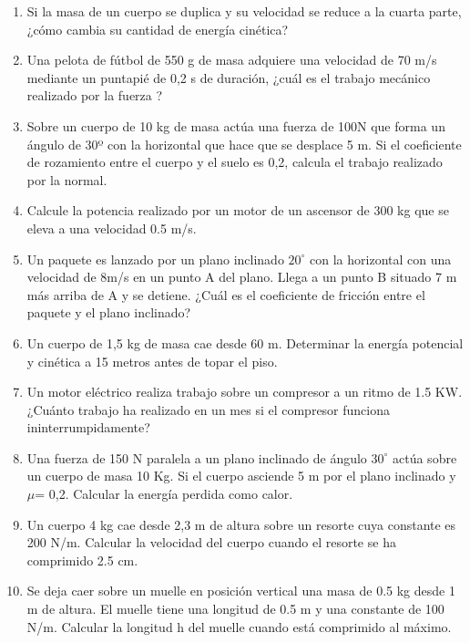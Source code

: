 \begin{enumerate}
\item  Si la masa de un cuerpo se duplica y su velocidad se reduce a la cuarta parte, ¿cómo cambia su cantidad de energía 
cinética?

\item  Una pelota de fútbol de 550 g de masa adquiere una velocidad de 70 m/s mediante un puntapié de 0,2 s de duración, ¿cuál 
es el trabajo mecánico realizado por la fuerza ? 

\item  Sobre un cuerpo de 10 kg de masa actúa una fuerza de 100N que forma un ángulo de 30º con la horizontal que hace que se 
desplace 5 m. Si el coeficiente de rozamiento entre el cuerpo y el suelo es 0,2, calcula el trabajo realizado por la normal. 

\item Calcule la potencia realizado por un motor de un ascensor de 300 kg que se eleva a una velocidad 0.5 m/s.

\item Un paquete es lanzado por un plano inclinado $20^\circ$ con la horizontal con una velocidad de 8m/s en un punto A del 
plano. Llega a un punto B situado 7 m más arriba de A y se detiene. ¿Cuál es el coeficiente de fricción entre el paquete y el
plano inclinado?

\item Un cuerpo de 1,5 kg de masa cae desde 60 m. Determinar la energía potencial y cinética a 15 metros antes de topar el piso.

\item  Un motor eléctrico realiza trabajo sobre un compresor a un ritmo de 1.5 KW. ¿Cuánto trabajo ha realizado en un mes si el 
compresor funciona ininterrumpidamente?

\item Una fuerza de 150 N paralela a un plano inclinado de ángulo $30^\circ$ actúa sobre un cuerpo de masa 10 Kg. Si el cuerpo 
asciende 5 m por el plano inclinado y $\mu$= 0,2. Calcular la energía perdida como calor.

\item  Un cuerpo 4 kg cae desde 2,3 m de altura sobre un resorte cuya constante es 200 N/m. Calcular la velocidad del cuerpo 
cuando el resorte se ha comprimido 2.5 cm.

\item Se deja caer sobre un muelle en posición vertical una masa de 0.5 kg desde 1 m de altura. El muelle tiene una longitud de 
0.5 m y una constante de 100 N/m. Calcular la longitud h del muelle cuando está comprimido al máximo.


\end{enumerate}
